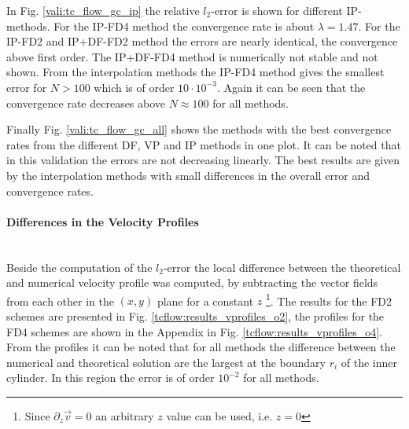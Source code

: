 In Fig. \ref{vali:tc_flow_gc_ip} the relative $l_2$-error is shown for different IP-methods.
For the IP-FD4 method the convergence rate is about $\lambda=1.47$.
For the IP-FD2 and IP+DF-FD2 method the errors are nearly  identical, the convergence above first order.
The IP+DF-FD4 method is numerically not stable and  not shown.
From the interpolation methods the IP-FD4 method gives the smallest error for $N>100$ which is of order $10 \cdot 10^{-3}$.
Again it can be seen that the convergence rate decreases above $N\approx100$ for all methods.


Finally Fig. \ref{vali:tc_flow_gc_all} shows the methods with the best convergence
rates from the different DF, VP and IP methods in one plot.
It can be noted that in this validation the errors are not decreasing linearly.
The best results are given by the interpolation methods with small differences in the overall error
and convergence rates.

\paragraph{Differences in the Velocity Profiles}\mbox{}\\

Beside the computation of the $l_2$-error the local difference between the theoretical and numerical velocity
profile was computed, by subtracting the vector fields from each other in the $(x, y)$ plane for a constant $z$
\footnote{Since $\partial_z \vec{v} = 0$ an arbitrary $z$ value can be used, i.e. $z=0$}.
The results for the FD2 schemes are presented in Fig. \ref{tcflow:results_vprofiles_o2}, the profiles
for the FD4 schemes are shown in the Appendix in Fig. \ref{tcflow:results_vprofiles_o4}.
From the profiles it can be noted that for all methods the difference between the numerical and
theoretical solution are the largest at the boundary $r_i$ of the  inner cylinder.
In this region the error is of order $10^{-2}$ for all methods.

